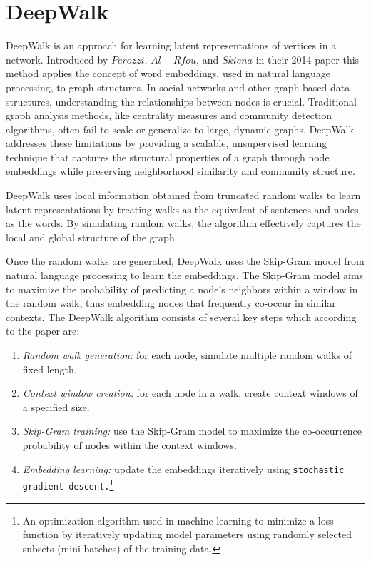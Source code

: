 \section{DeepWalk} 

DeepWalk is an approach for learning latent representations of vertices in a network. Introduced by $Perozzi$, $Al-Rfou$, and $Skiena$ in their 2014 paper \cite{DBLP:journals/corr/PerozziAS14} this method applies the concept of word embeddings, used in natural language processing, to graph structures. 
In social networks and other graph-based data structures, understanding the relationships between nodes is crucial. Traditional graph analysis methods, like centrality measures and community detection algorithms, often fail to scale or generalize to large, dynamic graphs. DeepWalk addresses these limitations by providing a scalable, unsupervised learning technique that captures the structural properties of a graph through node embeddings while preserving neighborhood similarity and community structure.

DeepWalk uses local information obtained from truncated random walks to learn latent representations by treating walks as the equivalent of sentences and nodes as the words. By simulating random walks, the algorithm effectively captures the local and global structure of the graph.

Once the random walks are generated, DeepWalk uses the Skip-Gram model \cite{DBLP:journals/corr/MikolovSCCD13} from natural language processing to learn the embeddings. The Skip-Gram model aims to maximize the probability of predicting a node's neighbors within a window in the random walk, thus embedding nodes that frequently co-occur in similar contexts. The DeepWalk algorithm consists of several key steps which according to the paper are:

\begin{enumerate}
   
    \item \emph{Random walk generation:} for each node, simulate multiple random walks of fixed length.
    \item \emph{Context window creation:} for each node in a walk, create context windows of a specified size.
    \item \emph{Skip-Gram training:} use the Skip-Gram model to maximize the co-occurrence probability of nodes within the context windows.
    \item \emph{Embedding learning:} update the embeddings iteratively using \verb+stochastic gradient descent.+\footnote{An optimization algorithm used in machine learning to minimize a loss function by iteratively updating model parameters using randomly selected subsets (mini-batches) of the training data.}
\end{enumerate}

